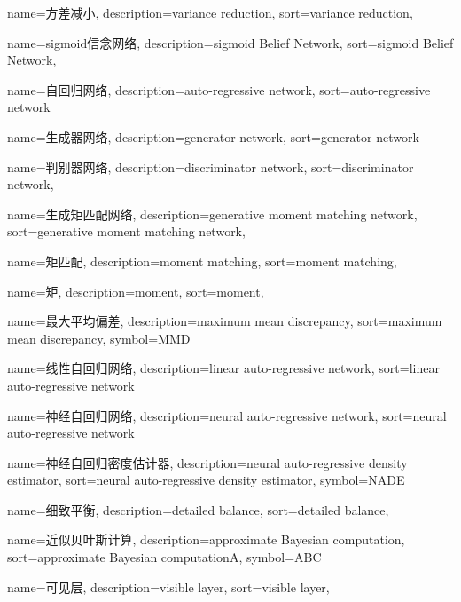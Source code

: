 {
  name=方差减小,
  description={variance reduction},
  sort={variance reduction},
}

{
  name=sigmoid信念网络,
  description={sigmoid Belief Network},
  sort={sigmoid Belief Network},
}

{
  name=自回归网络,
  description={auto-regressive network},
  sort={auto-regressive network}
}

{
  name=生成器网络,
  description={generator network},
  sort={generator network}
}

{
  name=判别器网络,
  description={discriminator network},
  sort={discriminator network},
}

{
  name=生成矩匹配网络,
  description={generative moment matching network},
  sort={generative moment matching network},
}

{
  name=矩匹配,
  description={moment matching},
  sort={moment matching},
}

{
  name=矩,
  description={moment},
  sort={moment},
}

{
  name=最大平均偏差,
  description={maximum mean discrepancy},
  sort={maximum mean discrepancy},
  symbol={MMD}
}

{
  name=线性自回归网络,
  description={linear auto-regressive network},
  sort={linear auto-regressive network}
}

{
  name=神经自回归网络,
  description={neural auto-regressive network},
  sort={neural auto-regressive network}
}

{
  name=神经自回归密度估计器,
  description={neural auto-regressive density estimator},
  sort={neural auto-regressive density estimator},
  symbol={NADE}
}

{
  name=细致平衡,
  description={detailed balance},
  sort={detailed balance},
}

{
  name=近似贝叶斯计算,
  description={approximate Bayesian computation},
  sort={approximate Bayesian computationA},
  symbol={ABC}
}

{
  name=可见层,
  description={visible layer},
  sort={visible layer},
}

